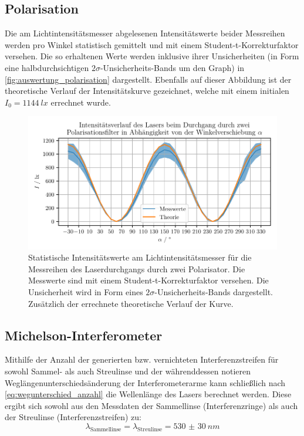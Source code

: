 \documentclass[ngerman]{scrartcl}
\begin{document}
\subsection{Polarisation}
\label{subsec:auswertung_polarisation}

Die am Lichtintensitätsmesser abgelesenen Intensitätswerte beider Messreihen werden pro Winkel statistisch gemittelt und mit einem Student-t-Korrekturfaktor versehen. Die so erhaltenen Werte werden inklusive ihrer Unsicherheiten (in Form eine halbdurchsichtigen $2 \sigma$-Unsicherheits-Bands um den Graph) in \autoref{fig:auswertung_polarisation} dargestellt. Ebenfalls auf dieser Abbildung ist der theoretische Verlauf der Intensitätskurve gezeichnet, welche mit einem initialen $I_0 = \SI{1144}{lx}$ errechnet wurde.
%
\begin{figure}[H]
    \centering
    \begin{samepage}
        \includegraphics[width=\linewidth]{../python/plots/polarisation.pdf}
        \caption[Messkurve Polarisation]{Statistische Intensitätswerte am Lichtintensitätsmesser für die Messreihen des Laserdurchgangs durch zwei Polarisator. Die Messwerte sind mit einem Student-t-Korrekturfaktor versehen. Die Unsicherheit wird in Form eines $2 \sigma$-Unsicherheits-Bands dargestellt. Zusätzlich der errechnete theoretische Verlauf der Kurve.}
        \label{fig:auswertung_polarisation}
    \end{samepage}
\end{figure}


\subsection{Michelson-Interferometer}
\label{subsec:auswertung_michelson}

Mithilfe der Anzahl der generierten bzw. vernichteten Interferenzstreifen für sowohl Sammel- als auch Streulinse und der währenddessen notieren Weglängenunterschiedsänderung der Interferometerarme kann schließlich nach \autoref{eq:wegunterschied_anzahl} die Wellenlänge des Lasers berechnet werden. Diese ergibt sich sowohl aus den Messdaten der Sammellinse (Interferenzringe) als auch der Streulinse (Interferenzstreifen) zu:
\[\lambda_{\text{Sammellinse}} = \lambda_{\text{Streulinse}} = \SI{530(30)}{nm}\]
\end{document}
